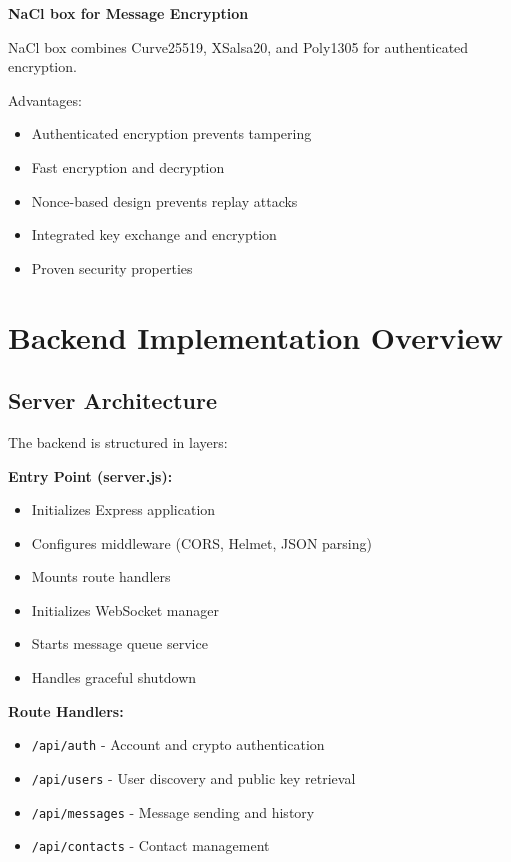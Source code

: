 \textbf{NaCl box for Message Encryption}

NaCl box combines Curve25519, XSalsa20, and Poly1305 for authenticated encryption.

Advantages:
\begin{itemize}
    \item Authenticated encryption prevents tampering
    \item Fast encryption and decryption
    \item Nonce-based design prevents replay attacks
    \item Integrated key exchange and encryption
    \item Proven security properties
\end{itemize}

\section{Backend Implementation Overview}

\subsection{Server Architecture}

The backend is structured in layers:

\textbf{Entry Point (server.js):}
\begin{itemize}
    \item Initializes Express application
    \item Configures middleware (CORS, Helmet, JSON parsing)
    \item Mounts route handlers
    \item Initializes WebSocket manager
    \item Starts message queue service
    \item Handles graceful shutdown
\end{itemize}

\textbf{Route Handlers:}
\begin{itemize}
    \item \texttt{/api/auth} - Account and crypto authentication
    \item \texttt{/api/users} - User discovery and public key retrieval
    \item \texttt{/api/messages} - Message sending and history
    \item \texttt{/api/contacts} - Contact management
\end{itemize}

